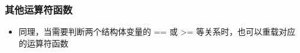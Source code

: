 \begin{frame}[fragile]
    \frametitle{其他运算符函数}

    \begin{itemize}
        \item 同理，当需要判断两个结构体变量的 == 或 >= 等关系时，也可以重载对应的运算符函数
        
         {}
         {}
         {}

    \end{itemize}

\end{frame}

